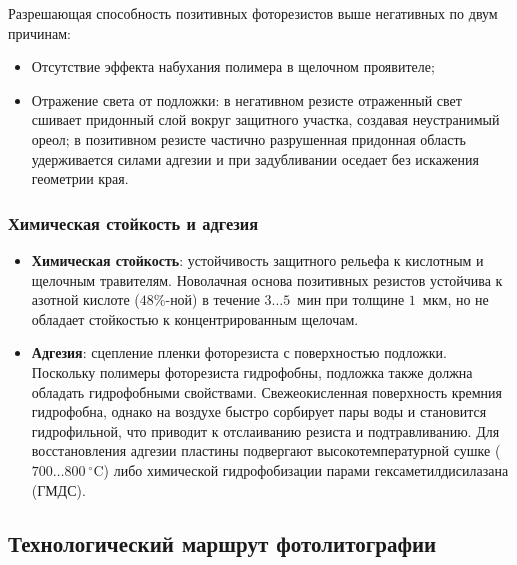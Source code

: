 \documentclass[12pt,a4paper]{article}
\theoremstyle{plain}
\theoremstyle{definition}
\theoremstyle{remark}
\numberwithin{equation}{section}
\begin{document}
Разрешающая способность позитивных фоторезистов выше негативных по двум причинам:
\begin{itemize}
  \item Отсутствие эффекта набухания полимера в щелочном проявителе;
  \item Отражение света от подложки: в негативном резисте отраженный свет сшивает придонный слой 
  вокруг защитного участка, создавая неустранимый ореол; в позитивном резисте частично разрушенная 
  придонная область удерживается силами адгезии и при задубливании оседает без искажения геометрии края.
\end{itemize}

\subsubsection{Химическая стойкость и адгезия}

\begin{itemize}
  \item \textbf{Химическая стойкость}: устойчивость защитного рельефа к кислотным и щелочным 
  травителям. Новолачная основа позитивных резистов устойчива к азотной кислоте ($48\%$-ной) 
  в течение $3 \dots 5$~мин при толщине $1$~мкм, но не обладает стойкостью к концентрированным щелочам.
  \item \textbf{Адгезия}: сцепление пленки фоторезиста с поверхностью подложки. Поскольку полимеры 
  фоторезиста гидрофобны, подложка также должна обладать гидрофобными свойствами. Свежеокисленная 
  поверхность кремния гидрофобна, однако на воздухе быстро сорбирует пары воды и становится гидрофильной, 
  что приводит к отслаиванию резиста и подтравливанию. Для восстановления адгезии пластины подвергают 
  высокотемпературной сушке ($700 \dots 800~^\circ\mathrm{C}$) либо химической гидрофобизации парами 
  гексаметилдисилазана (ГМДС).
\end{itemize}

\subsection{Технологический маршрут фотолитографии}
\end{document}
